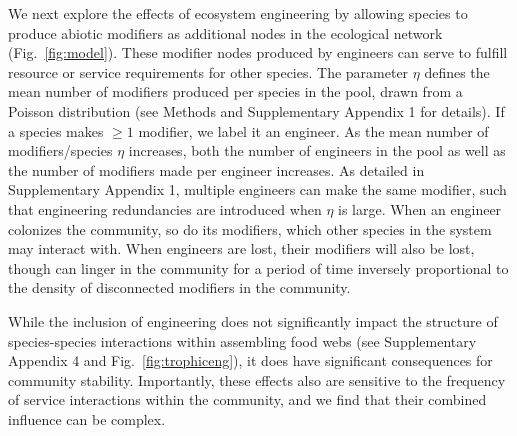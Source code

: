 \documentclass[twocolumn,preprintnumbers,amsmath,amssymb,superscriptaddress,linenumbers]{revtex4-1}
\begin{document}
\begin{bibunit}
We next explore the effects of ecosystem engineering by allowing species to produce abiotic modifiers as additional nodes in the ecological network (Fig.\ \ref{fig:model}).
These modifier nodes produced by engineers can serve to fulfill resource or service requirements for other species.
The parameter $\eta$ defines the mean number of modifiers produced per species in the pool, drawn from a Poisson distribution (see Methods and Supplementary Appendix 1 for details).
If a species makes $\geq 1$ modifier, we label it an engineer.
As the mean number of modifiers/species $\eta$ increases, both the number of engineers in the pool as well as the number of modifiers made per engineer increases.
As detailed in Supplementary Appendix 1, multiple engineers can make the same modifier, such that engineering redundancies are introduced when $\eta$ is large.
When an engineer colonizes the community, so do its modifiers, which other species in the system may interact with.
When engineers are lost, their modifiers will also be lost, though can linger in the community for a period of time inversely proportional to the density of disconnected modifiers in the community.






While the inclusion of engineering does not significantly impact the structure of species-species interactions within assembling food webs (see Supplementary Appendix 4 and Fig.\ \ref{fig:trophiceng}), it does have significant consequences for community stability.
Importantly, these effects also are sensitive to the frequency of service interactions within the community, and we find that their combined influence can be complex.


\end{bibunit}
\end{document}
